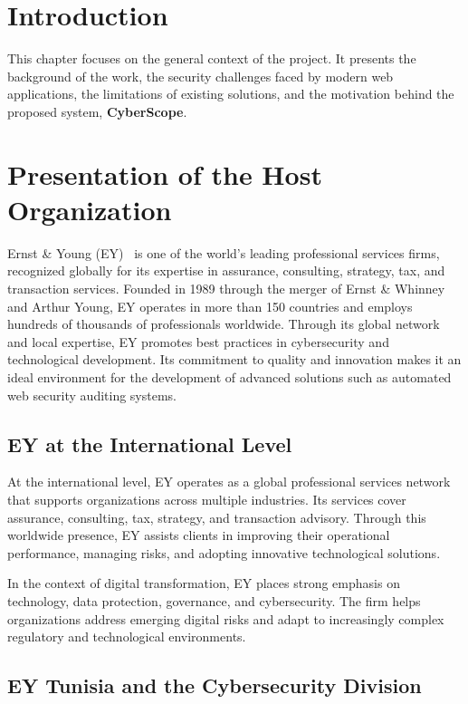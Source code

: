 ﻿\section{Introduction}

\justifying
This chapter focuses on the general context of the project. It presents the background of the work, the security challenges faced by modern web applications, the limitations of existing solutions, and the motivation behind the proposed system, \textbf{CyberScope}.

\section{Presentation of the Host Organization}

\justifying
Ernst \& Young (EY)~\cite{ey} is one of the world's leading professional services firms, recognized globally for its expertise in assurance, consulting, strategy, tax, and transaction services. Founded in 1989 through the merger of Ernst \& Whinney and Arthur Young, EY operates in more than 150 countries and employs hundreds of thousands of professionals worldwide.
\indent Through its global network and local expertise, EY promotes best practices in cybersecurity and technological development. Its commitment to quality and innovation makes it an ideal environment for the development of advanced solutions such as automated web security auditing systems.

\subsection{EY at the International Level}

\indent At the international level, EY operates as a global professional services network that supports organizations across multiple industries. Its services cover assurance, consulting, tax, strategy, and transaction advisory. Through this worldwide presence, EY assists clients in improving their operational performance, managing risks, and adopting innovative technological solutions.

\indent In the context of digital transformation, EY places strong emphasis on technology, data protection, governance, and cybersecurity. The firm helps organizations address emerging digital risks and adapt to increasingly complex regulatory and technological environments.

\subsection{EY Tunisia and the Cybersecurity Division}

